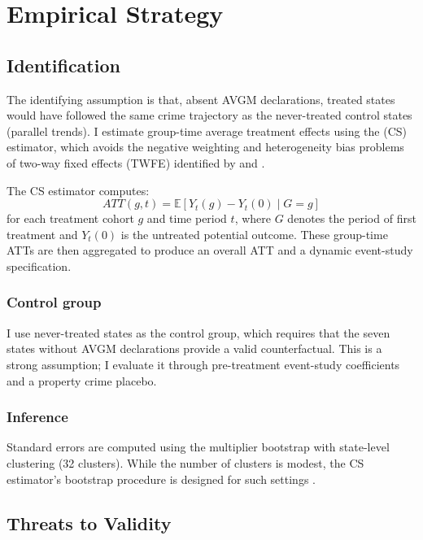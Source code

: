 \documentclass[12pt]{article}
\newcommand{\E}{\mathbb{E}}
\begin{document}



\section{Empirical Strategy}

\subsection{Identification}

The identifying assumption is that, absent AVGM declarations, treated states would have followed the same crime trajectory as the never-treated control states (parallel trends). I estimate group-time average treatment effects using the \citet{callaway_santanna2021} (CS) estimator, which avoids the negative weighting and heterogeneity bias problems of two-way fixed effects (TWFE) identified by \citet{goodman_bacon2021} and \citet{dechaisemartin_dhaultfoeuille2020}.

The CS estimator computes:
\begin{equation}
ATT(g,t) = \E\left[Y_t(g) - Y_t(0) \mid G = g\right]
\end{equation}
for each treatment cohort $g$ and time period $t$, where $G$ denotes the period of first treatment and $Y_t(0)$ is the untreated potential outcome. These group-time ATTs are then aggregated to produce an overall ATT and a dynamic event-study specification.

\subsubsection*{Control group} I use never-treated states as the control group, which requires that the seven states without AVGM declarations provide a valid counterfactual. This is a strong assumption; I evaluate it through pre-treatment event-study coefficients and a property crime placebo.

\subsubsection*{Inference} Standard errors are computed using the multiplier bootstrap with state-level clustering (32 clusters). While the number of clusters is modest, the CS estimator's bootstrap procedure is designed for such settings \citep{callaway_santanna2021}.

\subsection{Threats to Validity}
\end{document}

